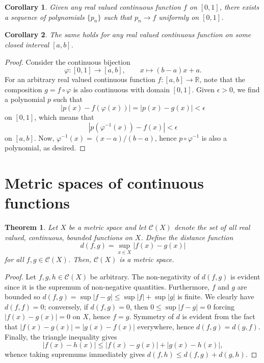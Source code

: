 \documentclass[11pt]{article}
\def\R{\mathbb{R}}
\newtheorem{theorem}{Theorem}[section]
\newtheorem{corollary}{Corollary}[theorem]
\theoremstyle{definition}
\theoremstyle{remark}
\begin{document}
    \begin{corollary}
        Given any real valued continuous function $f$ on $[0, 1]$, there exists a
        sequence of polynomials $\{p_n\}$ such that $p_n \to f$ uniformly on $[0,
        1]$.
    \end{corollary}
    \begin{corollary}
        The same holds for any real valued continuous function on some closed interval
        $[a, b]$.
    \end{corollary}
    \begin{proof}
        Consider the continuous bijection \[
            \varphi\colon [0, 1] \to [a, b], \qquad x \mapsto (b - a)x + a.
        \] For an arbitrary real valued continuous function $f\colon [a, b] \to \R$,
        note that the composition $g = f\circ \varphi$ is also continuous with domain
        $[0, 1]$. Given $\epsilon > 0$, we find a polynomial $p$ such that \[
            |p(x) - f(\varphi(x))| = |p(x) - g(x)| < \epsilon
        \] on $[0, 1]$, which means that \[
            |p(\varphi^{-1}(x)) - f(x)| < \epsilon
        \] on $[a, b]$. Now, $\varphi^{-1}(x) = (x - a) / (b - a)$, hence $p \circ
        \varphi^{-1}$ is also a polynomial, as desired.
    \end{proof}


    \section{Metric spaces of continuous functions}
    \begin{theorem}
        Let $X$ be a metric space and let $\mathscr{C}(X)$ denote the set of all
        real valued, continuous, bounded functions on $X$. Define the distance function \[
            d(f, g) = \sup_{x\in X} |f(x) - g(x)|
        \] for all $f, g \in \mathscr{C}(X)$. Then, $\mathscr{C}(X)$ is a metric space.
    \end{theorem}
    \begin{proof}
        Let $f, g, h\in \mathscr{C}(X)$ be arbitrary. The non-negativity of $d(f, g)$ is
        evident since it is the supremum of non-negative quantities. Furthermore, $f$
        and $g$ are bounded so $d(f, g) = \sup |f - g| \leq \sup |f| + \sup |g|$ is
        finite. We clearly have $d(f, f) = 0$; conversely, if $d(f, g) = 0$, then
        $0 \leq \sup |f - g| = 0$ forcing $|f(x) - g(x)| = 0$ on $X$, hence $f = g$.
        Symmetry of $d$ is evident from the fact that $|f(x) - g(x)| = |g(x) - f(x)|$
        everywhere, hence $d(f, g) = d(g, f)$. Finally, the triangle inequality gives
        \[
            |f(x) - h(x)| \leq |f(x) - g(x)| + |g(x) - h(x)|,
        \] whence taking supremums immediately gives $d(f, h) \leq d(f, g) + d(g,
        h)$.
    \end{proof}
\end{document}
